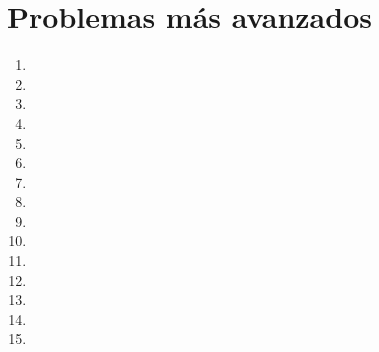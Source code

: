 \section{Problemas más avanzados}
\begin{enumerate}
    \item
    

    \item 
    

    \item 
    

    \item
    

    \item 
    

    \item 
    

    \item
    

    \item
    

    \item
    

    \item
    

    \item
    

    \item
    

    \item
    
    
    \item 
    

    \item
    
\end{enumerate}

\newpage
